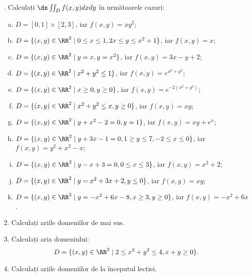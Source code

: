 \indent{}. Calculați $ \ds\iint_D f(x, y) dx dy $ în următoarele cazuri:
\begin{enumerate}[(a)]
    \item $ D = [0, 1] \times [2, 3] $, iar $ f(x, y) = xy^2 $;
    \item $ D = \{(x, y) \in \RR^2 \mid 0 \leq x \leq 1, 2x \leq y \leq x^2 + 1 \} $,
        iar $ f(x, y) = x $;
    \item $ D = \{(x, y) \in \RR^2 \mid y = x, y = x^2 \} $, iar
        $ f(x, y) = 3x - y + 2 $;
    \item $ D = \{(x, y) \in \RR^2 \mid x^2 + y^2 \leq 1 \} $,
        iar $ f(x, y) = e^{x^2 + y^2} $;
    \item $ D = \{(x, y) \in \RR^2 \mid x \geq 0, y \geq 0 \} $,
        iar $ f(x, y) = e^{-2(x^2 + y^2)} $;
    \item $ D = \{(x, y) \in \RR^2 \mid x^2 + y^2 \leq x, y \geq 0 \} $,
        iar $ f(x, y) = xy $;
    \item $ D = \{ (x, y) \in \RR^2 \mid y + x^2 - 2 = 0, y = 1 \} $,
        iar $ f(x, y) = xy + e^x $;
    \item $ D = \{ (x, y) \in \RR^2 \mid y + 3x - 1 = 0, 1 \geq y \leq 7, -2 \leq x \leq 0 \} $,
        iar $ f(x, y) = y^2 + x^2 - x $;
    \item $ D = \{ (x, y) \in \RR^2 \mid y - x + 3 = 0, 0 \leq x \leq 3 \} $,
        iar $ f(x, y) = x^2 + 2 $;
    \item $ D = \{ (x, y) \in \RR^2 \mid y = x^2 + 3x + 2, y \leq 0 \} $,
        iar $ f(x, y) = xy $;
    \item $ D = \{ (x, y) \in \RR^2 \mid y = -x^2 + 6x - 8, x \geq 3, y \geq 0 \} $,
        iar $ f(x, y) = -x^2 + 6x $.
\end{enumerate}

\vspace{0.5cm}

2. Calculați ariile domeniilor de mai sus.

\vspace{0.5cm}

3. Calculați aria domeniului:
\[
    D = \{(x, y) \in \RR^2 \mid 2 \leq x^2 + y^2 \leq 4, x + y \geq 0 \}.
\]

\vspace{0.5cm}

4. Calculați ariile domeniilor de la începutul lecției.

